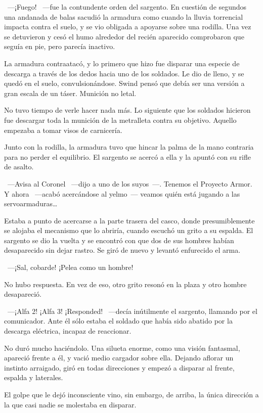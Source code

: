 ~---¡Fuego! ~---fue la contundente orden del sargento. En cuestión de segundos una andanada de balas sacudió la armadura como cuando la lluvia torrencial impacta contra el suelo, y se vio obligada a apoyarse sobre una rodilla. Una vez se detuvieron y cesó el humo alrededor del recién aparecido comprobaron que seguía en pie, pero parecía inactivo.

La armadura contraatacó, y lo primero que hizo fue disparar una especie de descarga a través de los dedos hacia uno de los soldados. Le dio de lleno, y se quedó en el suelo, convulsionándose. Swind pensó que debía ser una versión a gran escala de un táser. Munición no letal.

No tuvo tiempo de verle hacer nada más. Lo siguiente que los soldados hicieron fue descargar toda la munición de la metralleta contra su objetivo. Aquello empezaba a tomar visos de carnicería.

Junto con la rodilla, la armadura tuvo que hincar la palma de la mano contraria para no perder el equilibrio. El sargento se acercó a ella y la apuntó con su rifle de asalto.

~---Avisa al Coronel ~---dijo a uno de los suyos~---. Tenemos el Proyecto Armor. Y ahora ~---acabó acercándose al yelmo~--- veamos quién está jugando a las servoarmaduras\dots

Estaba a punto de acercarse a la parte trasera del casco, donde presumiblemente se alojaba el mecanismo que lo abriría, cuando escuchó un grito a su espalda. El sargento se dio la vuelta y se encontró con que dos de sus hombres habían desaparecido sin dejar rastro. Se giró de nuevo y levantó enfurecido el arma.

~---¡Sal, cobarde! ¡Pelea como un hombre!

No hubo respuesta. En vez de eso, otro grito resonó en la plaza y otro hombre desapareció.

~---¡Alfa 2! ¡Alfa 3! ¡Responded! ~---decía inútilmente el sargento, llamando por el comunicador. Ante él sólo estaba el soldado que había sido abatido por la descarga eléctrica, incapaz de reaccionar.

No duró mucho haciéndolo. Una silueta enorme, como una visión fantasmal, apareció frente a él, y vació medio cargador sobre ella. Dejando aflorar un instinto arraigado, giró en todas direcciones y empezó a disparar al frente, espalda y laterales.

El golpe que le dejó inconsciente vino, sin embargo, de arriba, la única dirección a la que casi nadie se molestaba en disparar.

